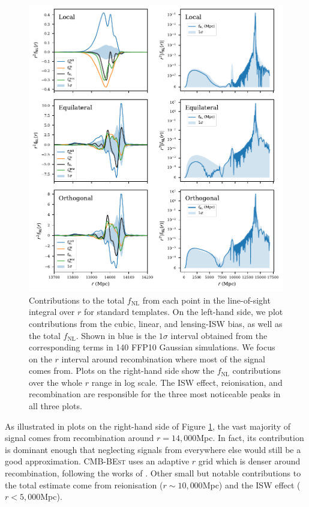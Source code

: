 \begin{figure}[htbp!] 
	\centering    
	\includegraphics{trio_r_dependence.pdf}
	\caption{Contributions to the total $f_\text{NL}$ from each point in the line-of-sight integral over $r$ for standard templates. On the left-hand side, we plot contributions from the cubic, linear, and lensing-ISW bias, as well as the total $f_\text{NL}$. Shown in blue is the $1\sigma$ interval obtained from the corresponding terms in 140 FFP10 Gaussian simulations. We focus on the $r$ interval around recombination where most of the signal comes from. Plots on the right-hand side show the $f_\text{NL}$ contributions over the whole $r$ range in log scale. The ISW effect, reionisation, and recombination are responsible for the three most noticeable peaks in all three plots.}
	\label{fig:trio_r_dependence}
\end{figure}

As illustrated in plots on the right-hand side of Figure \ref{fig:trio_r_dependence}, the vast majority of signal comes from recombination around $r = 14,000$Mpc. In fact, its contribution is dominant enough that neglecting signals from everywhere else would still be a good approximation. \textsc{CMB-BEst} uses an adaptive $r$ grid which is denser around recombination, following the works of \cite{Smith2011}. Other small but notable contributions to the total estimate come from reionisation ($r \sim 10,000$Mpc) and the ISW effect ($r < 5,000$Mpc).

